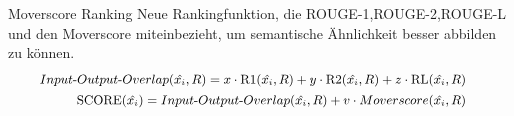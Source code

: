 \begin{frame}{Moverscore Ranking}
  Neue Rankingfunktion, die ROUGE-1,ROUGE-2,ROUGE-L und den Moverscore miteinbezieht, um semantische Ähnlichkeit besser abbilden zu können.
  \begin{align*}
    \small
    \begin{split}
    Input\text{-}Output\text{-}Overlap(\hat{x_i}, R) &= x \cdot \text{R1}(\hat{x_i}, R)+y\cdot \text{R2}(\hat{x_i}, R)+z\cdot \text{RL}(\hat{x_i}, R) 
\end{split}\\
\small
\begin{split}
    \text{SCORE}(\hat{x_i}) &= Input\text{-}Output\text{-}Overlap(\hat{x_i}, R) + v \cdot Moverscore(\hat{x_i}, R) 
\end{split}
\end{align*}
\end{frame}

